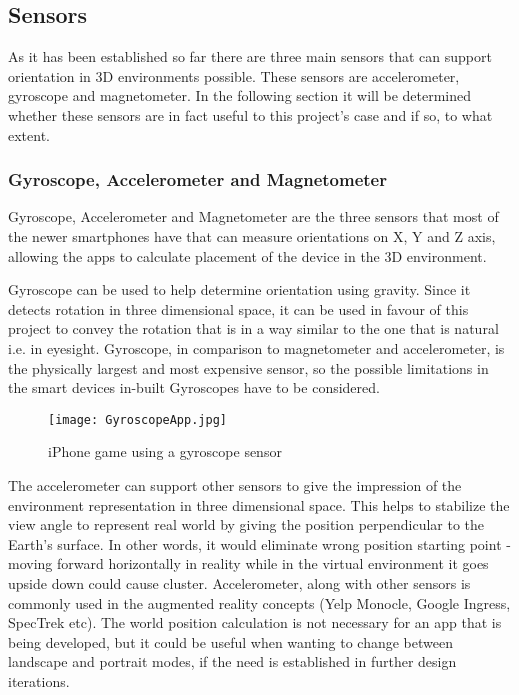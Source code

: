 \subsection{Sensors} \label{sensors}

As it has been established so far there are three main sensors that can support orientation in 3D environments possible. These sensors are accelerometer, gyroscope and magnetometer. In the following section it will be determined whether these sensors are in fact useful to this project's case and if so, to what extent.

\subsubsection*{Gyroscope, Accelerometer and Magnetometer}
Gyroscope, Accelerometer and Magnetometer are the three sensors that most of the newer smartphones have \cite{AndroidDevelopers} that can measure orientations on X, Y and Z axis, allowing the apps to calculate placement of the device in the 3D environment.

Gyroscope can be used to help determine orientation using gravity. Since it detects rotation in three dimensional space, it can be used in favour of this project to convey the rotation that is in a way similar to the one that is natural i.e. in eyesight. Gyroscope, in comparison to magnetometer and accelerometer, is the physically largest and most expensive sensor, so the possible limitations in the smart devices in-built Gyroscopes have to be considered.

\begin{figure}[H]
\centering
\texttt{[image: GyroscopeApp.jpg]}
\caption{iPhone game using a gyroscope sensor}
\end{figure}

The accelerometer can support other sensors to give the impression of the environment representation in three dimensional space. This helps to stabilize the view angle to represent real world by giving the position perpendicular to the Earth's surface. In other words, it would eliminate wrong position starting point - moving forward horizontally in reality while in the virtual environment it goes upside down could cause cluster. Accelerometer, along with other sensors is commonly used in the augmented reality concepts (Yelp Monocle, Google Ingress, SpecTrek etc). The world position calculation is not necessary for an app that is being developed, but it could be useful when wanting to change between landscape and portrait modes, if the need is established in further design iterations.

